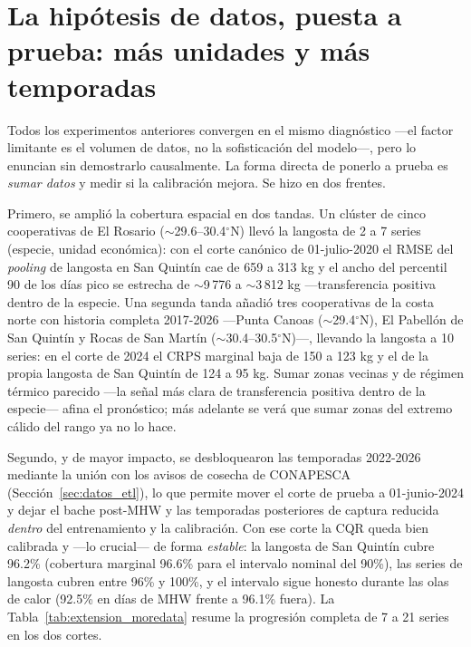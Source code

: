 \section{La hipótesis de datos, puesta a prueba: más unidades y más temporadas}
\label{sec:res_moredata}
Todos los experimentos anteriores convergen en el mismo diagnóstico ---el factor limitante es el volumen de datos, no la sofisticación del modelo---, pero lo enuncian sin demostrarlo causalmente. La forma directa de ponerlo a prueba es \emph{sumar datos} y medir si la calibración mejora. Se hizo en dos frentes.

Primero, se amplió la cobertura espacial en dos tandas. Un clúster de cinco cooperativas de El Rosario ($\sim$29.6--30.4$^\circ$N) llevó la langosta de 2 a 7 series (especie, unidad económica): con el corte canónico de 01-julio-2020 el RMSE del \emph{pooling} de langosta en San Quintín cae de 659 a 313 kg y el ancho del percentil 90 de los días pico se estrecha de $\sim$9\,776 a $\sim$3\,812 kg ---transferencia positiva dentro de la especie. Una segunda tanda añadió tres cooperativas de la costa norte con historia completa 2017-2026 ---Punta Canoas ($\sim$29.4$^\circ$N), El Pabellón de San Quintín y Rocas de San Martín ($\sim$30.4--30.5$^\circ$N)---, llevando la langosta a 10 series: en el corte de 2024 el CRPS marginal baja de 150 a 123 kg y el de la propia langosta de San Quintín de 124 a 95 kg. Sumar zonas vecinas y de régimen térmico parecido ---la señal más clara de transferencia positiva dentro de la especie--- afina el pronóstico; más adelante se verá que sumar zonas del extremo cálido del rango ya no lo hace.

Segundo, y de mayor impacto, se desbloquearon las temporadas 2022-2026 mediante la unión con los avisos de cosecha de CONAPESCA (Sección~\ref{sec:datos_etl}), lo que permite mover el corte de prueba a 01-junio-2024 y dejar el bache post-MHW y las temporadas posteriores de captura reducida \emph{dentro} del entrenamiento y la calibración. Con ese corte la CQR queda bien calibrada y ---lo crucial--- de forma \emph{estable}: la langosta de San Quintín cubre 96.2\% (cobertura marginal 96.6\% para el intervalo nominal del 90\%), las series de langosta cubren entre 96\% y 100\%, y el intervalo sigue honesto durante las olas de calor (92.5\% en días de MHW frente a 96.1\% fuera). La Tabla~\ref{tab:extension_moredata} resume la progresión completa de 7 a 21 series en los dos cortes.

